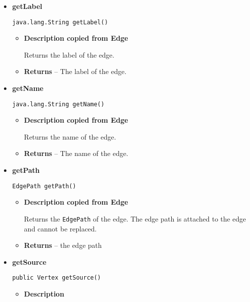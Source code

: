 {{{{{{{{{{{{{{{{{\begin{itemize}
{\begin{itemize}
{Returns the ID of the edge.
}
\item{{\bf  Returns} -- 
The id of the edge. 
}%
\end{itemize}
}%
\item{ 
{\bf  getLabel}\\
\begin{lstlisting}[frame=none]
java.lang.String getLabel()\end{lstlisting} %
\begin{itemize}
\item{
{\bf  Description copied from Edge{\small {}} }

Returns the label of the edge.
}
\item{{\bf  Returns} -- 
The label of the edge. 
}%
\end{itemize}
}%
\item{ 
{\bf  getName}\\
\begin{lstlisting}[frame=none]
java.lang.String getName()\end{lstlisting} %
\begin{itemize}
\item{
{\bf  Description copied from Edge{\small {}} }

Returns the name of the edge.
}
\item{{\bf  Returns} -- 
The name of the edge. 
}%
\end{itemize}
}%
\item{ 
{\bf  getPath}\\
\begin{lstlisting}[frame=none]
EdgePath getPath()\end{lstlisting} %
\begin{itemize}
\item{
{\bf  Description copied from Edge{\small {}} }

Returns the \texttt{\small EdgePath}{\small 
{}} of the edge. The edge path is attached to the edge and cannot be replaced.
}
\item{{\bf  Returns} -- 
the edge path 
}%
\end{itemize}
}%
\item{ 
{\bf  getSource}\\
\begin{lstlisting}[frame=none]
public Vertex getSource()\end{lstlisting} %
\begin{itemize}
\item{
{\bf  Description}

}
\end{itemize}}
\end{itemize}}}}}}}}}}}}}}}}}}
